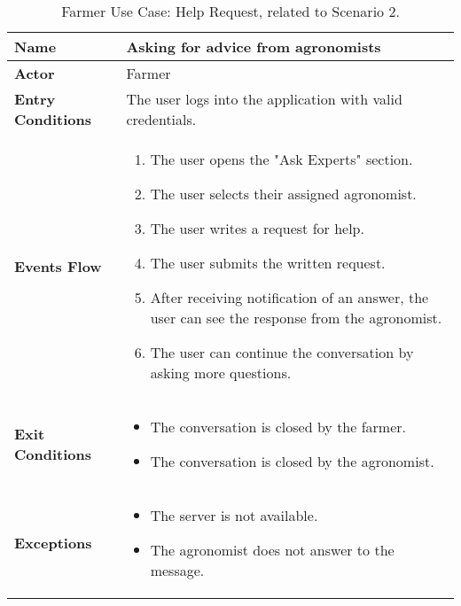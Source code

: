 \begin{table}[hbt!]
\centering
\small
\caption{\label{tab:farmerSeekAdvice}Farmer Use Case: Help Request, related to Scenario 2.}
\renewcommand{\arraystretch}{1.25}

\begin{tabular}{|l|>{\raggedright\arraybackslash}m{12cm}|}

    \hline
    \textbf{Name} & Asking for advice from agronomists\\
    \hline
   	\textbf{Actor} & Farmer\\
    \hline
    \textbf{Entry Conditions} & The user logs into the application with valid credentials.\\
    \hline
    
    \textbf{Events Flow} & 
    		\begin{enumerate}
    			\item The user opens the "Ask Experts" section.
    			\item The user selects their assigned agronomist.
    			\item The user writes a request for help.
    			\item The user submits the written request.
    			\item After receiving notification of an answer, the user can see the response from the agronomist.
    			\item The user can continue the conversation by asking more questions.
    		\end{enumerate}
    	\\
    \hline
    \textbf{Exit Conditions} & \begin{itemize}
    	\item The conversation is closed by the farmer.
    	\item The conversation is closed by the agronomist.
    	\end{itemize}
    	\\
    \hline
    \textbf{Exceptions} & 
    		\begin{itemize}
    		    	\item The server is not available.
    			\item The agronomist does not answer to the message.
    		\end{itemize}
    \\
    \hline
\end{tabular}
\end{table}